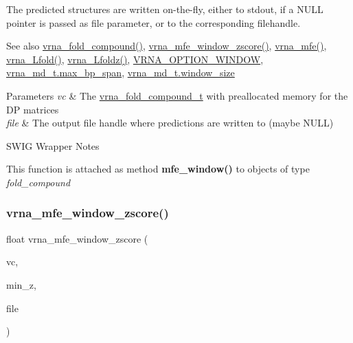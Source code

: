 The predicted structures are written on-\/the-\/fly, either to stdout, if a N\+U\+LL pointer is passed as file parameter, or to the corresponding filehandle.

\begin{DoxySeeAlso}{See also}
\mbox{\hyperlink{group__fold__compound_ga6601d994ba32b11511b36f68b08403be}{vrna\+\_\+fold\+\_\+compound()}}, \mbox{\hyperlink{group__mfe__window_gaa4f67ae94efd08d800c17f9b53423fd6}{vrna\+\_\+mfe\+\_\+window\+\_\+zscore()}}, \mbox{\hyperlink{group__mfe__global_gabd3b147371ccf25c577f88bbbaf159fd}{vrna\+\_\+mfe()}}, \mbox{\hyperlink{group__mfe__window_ga4918cce52bf69c1913cda503b2ac75d8}{vrna\+\_\+\+Lfold()}}, \mbox{\hyperlink{group__mfe__window_ga27fddda5fc63eb49c861e38845fc34b4}{vrna\+\_\+\+Lfoldz()}}, \mbox{\hyperlink{group__fold__compound_ga2b2a8009ccdccc3eb1571556261aee8e}{V\+R\+N\+A\+\_\+\+O\+P\+T\+I\+O\+N\+\_\+\+W\+I\+N\+D\+OW}}, \mbox{\hyperlink{group__model__details_a659e5fcc6e8c9f1a68e7de6548eef3b0}{vrna\+\_\+md\+\_\+t.\+max\+\_\+bp\+\_\+span}}, \mbox{\hyperlink{group__model__details_abea42f9229f8d8d6bcbedef316315bfc}{vrna\+\_\+md\+\_\+t.\+window\+\_\+size}}
\end{DoxySeeAlso}

\begin{DoxyParams}{Parameters}
{\em vc} & The \mbox{\hyperlink{group__fold__compound_ga1b0cef17fd40466cef5968eaeeff6166}{vrna\+\_\+fold\+\_\+compound\+\_\+t}} with preallocated memory for the DP matrices \\
\hline
{\em file} & The output file handle where predictions are written to (maybe N\+U\+LL)\\
\hline
\end{DoxyParams}
\begin{DoxyRefDesc}{S\+W\+I\+G Wrapper Notes}
\item[\mbox{\hyperlink{wrappers__wrappers000090}{S\+W\+I\+G Wrapper Notes}}]This function is attached as method {\bfseries{mfe\+\_\+window()}} to objects of type {\itshape fold\+\_\+compound} \end{DoxyRefDesc}
\mbox{\label{group__mfe__window_gaa4f67ae94efd08d800c17f9b53423fd6}} 
\subsubsection{\texorpdfstring{vrna\_mfe\_window\_zscore()}{vrna\_mfe\_window\_zscore()}}
{\footnotesize\ttfamily float vrna\+\_\+mfe\+\_\+window\+\_\+zscore (\begin{DoxyParamCaption}\item[{\mbox{\hyperlink{group__fold__compound_ga1b0cef17fd40466cef5968eaeeff6166}{vrna\+\_\+fold\+\_\+compound\+\_\+t}} $\ast$}]{vc,  }\item[{double}]{min\+\_\+z,  }\item[{F\+I\+LE $\ast$}]{file }\end{DoxyParamCaption})}




